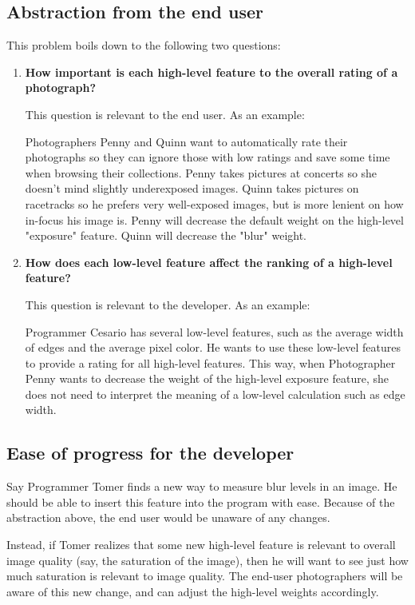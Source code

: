 \documentclass[10pt,twocolumn]{article}
\begin{document}
\subsection{Abstraction from the end user}
This problem boils down to the following two questions:

\begin{enumerate}
\item \textbf{How important is each high-level feature to the overall rating of a photograph?}

This question is relevant to the end user. As an example:

Photographers Penny and Quinn want to automatically rate their photographs so they can ignore those with low ratings and save some time when browsing their collections. Penny takes pictures at concerts so she doesn't mind slightly underexposed images. Quinn takes pictures on racetracks so he prefers very well-exposed images, but is more lenient on how in-focus his image is. Penny will decrease the default weight on the high-level "exposure" feature. Quinn will decrease the "blur" weight.

\item \textbf{How does each low-level feature affect the ranking of a high-level feature?}

This  question is relevant to the developer. As an example:

Programmer Cesario has several low-level features, such as the average width of edges and the average pixel color. He wants to use these low-level features to provide a rating for all high-level features. This way, when Photographer Penny wants to decrease the weight of the high-level exposure feature, she does not need to interpret the meaning of a low-level calculation such as edge width.
\end{enumerate}

\subsection{Ease of progress for the developer}
Say Programmer Tomer finds a new way to measure blur levels in an image. He should be able to insert this feature into the program with ease. Because of the abstraction above, the end user would be unaware of any changes.

Instead, if Tomer realizes that some new high-level feature is relevant to overall image quality (say, the saturation of the image), then he will want to see just how much saturation is relevant to image quality. The end-user photographers will be aware of this new change, and can adjust the high-level weights accordingly.
\end{document}
